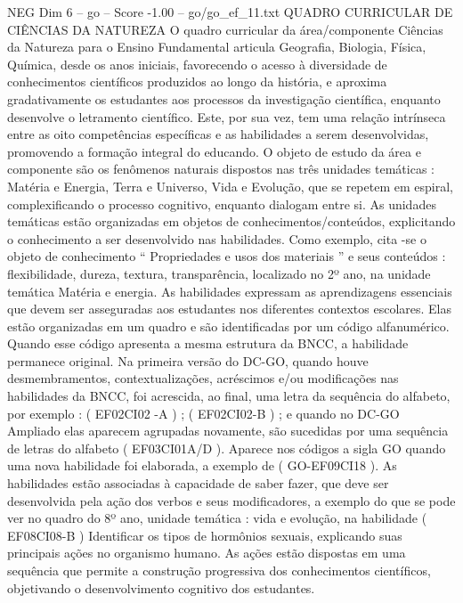 \begin{textsample}{NEG Dim 6 – go – Score -1.00 – go/go\_ef\_11.txt}  \label{ex:f6_neg_177}
QUADRO CURRICULAR DE CIÊNCIAS DA NATUREZA O quadro curricular da área/componente Ciências da Natureza para o Ensino Fundamental articula Geografia, Biologia, Física, Química, desde os anos iniciais, favorecendo o acesso à diversidade de conhecimentos científicos produzidos ao longo da história, e aproxima gradativamente os estudantes aos processos da investigação científica, enquanto desenvolve o letramento científico.
Este, por sua vez, tem uma relação intrínseca entre as oito competências específicas e as habilidades a serem desenvolvidas, promovendo a formação integral do educando.
O objeto de estudo da área e componente são os fenômenos naturais dispostos nas três unidades temáticas : Matéria e Energia, Terra e Universo, Vida e Evolução, que se repetem em espiral, complexificando o processo cognitivo, enquanto dialogam entre si.
As unidades temáticas estão organizadas em objetos de conhecimentos/conteúdos, explicitando o conhecimento a ser desenvolvido nas habilidades.
Como exemplo, cita -se o objeto de conhecimento “ Propriedades e usos dos materiais ” e seus conteúdos : flexibilidade, dureza, textura, transparência, localizado no 2º ano, na unidade temática Matéria e energia.
As habilidades expressam as aprendizagens essenciais que devem ser asseguradas aos estudantes nos diferentes contextos escolares.
Elas estão organizadas em um quadro e são identificadas por um código alfanumérico.
Quando esse código apresenta a mesma estrutura da BNCC, a habilidade permanece original.
Na primeira versão do DC-GO, quando houve desmembramentos, contextualizações, acréscimos e/ou modificações nas habilidades da BNCC, foi acrescida, ao final, uma letra da sequência do alfabeto, por exemplo : ( EF02CI02 -A ) ; ( EF02CI02-B ) ; e quando no DC-GO Ampliado elas aparecem agrupadas novamente, são sucedidas por uma sequência de letras do alfabeto ( EF03CI01A/D ).
Aparece nos códigos a sigla GO quando uma nova habilidade foi elaborada, a exemplo de ( GO-EF09CI18 ).
As habilidades estão associadas à capacidade de saber fazer, que deve ser desenvolvida pela ação dos verbos e seus modificadores, a exemplo do que se pode ver no quadro do 8º ano, unidade temática : vida e evolução, na habilidade ( EF08CI08-B ) Identificar os tipos de hormônios sexuais, explicando suas principais ações no organismo humano.
As ações estão dispostas em uma sequência que permite a construção progressiva dos conhecimentos científicos, objetivando o desenvolvimento cognitivo dos estudantes.

\end{textsample}
